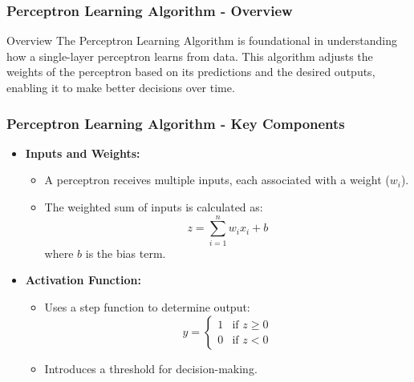 \documentclass[aspectratio=169]{beamer}
\begin{document}
\begin{frame}[fragile]
    \frametitle{Perceptron Learning Algorithm - Overview}
    \begin{block}{Overview}
        The Perceptron Learning Algorithm is foundational in understanding how a single-layer perceptron learns from data. 
        This algorithm adjusts the weights of the perceptron based on its predictions and the desired outputs, enabling 
        it to make better decisions over time.
    \end{block}
\end{frame}

\begin{frame}[fragile]
    \frametitle{Perceptron Learning Algorithm - Key Components}
    \begin{itemize}
        \item \textbf{Inputs and Weights:}
        \begin{itemize}
            \item A perceptron receives multiple inputs, each associated with a weight (\(w_i\)).
            \item The weighted sum of inputs is calculated as:
            \[
            z = \sum_{i=1}^{n} w_i x_i + b
            \]
            where \(b\) is the bias term.
        \end{itemize}

        \item \textbf{Activation Function:}
        \begin{itemize}
            \item Uses a step function to determine output:
            \[
            y =
            \begin{cases} 
            1 & \text{if } z \geq 0 \\
            0 & \text{if } z < 0 
            \end{cases}
            \]
            \item Introduces a threshold for decision-making.
        \end{itemize}
    \end{itemize}
\end{frame}
\end{document}
